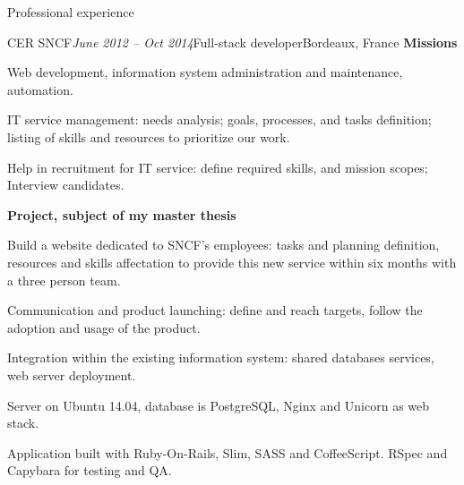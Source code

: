 \begin{rSection}{Professional experience}
\begin{rSubsection}{CER SNCF}{\em June 2012 -- Oct 2014}{Full-stack developer}{Bordeaux, France}
    \textbf{Missions}
      \item Web development, information system administration and maintenance, automation.
      \item IT service management: needs analysis; goals, processes, and tasks definition; listing of skills and resources to prioritize our work.
      \item Help in recruitment for IT service: define required skills, and mission scopes; Interview candidates.

    \textbf{Project, subject of my master thesis}
      \item Build a website dedicated to SNCF's employees: tasks and planning definition, resources and skills affectation to provide this new service within six months with a three person team.
      \item Communication and product launching: define and reach targets, follow the adoption and usage of the product.
      \item Integration within the existing information system: shared databases services, web server deployment.
      \item Server on Ubuntu 14.04, database is PostgreSQL, Nginx and Unicorn as web stack.
      \item Application built with Ruby-On-Rails, Slim, SASS and CoffeeScript. RSpec and Capybara for testing and QA.

  \end{rSubsection}

\end{rSection}
